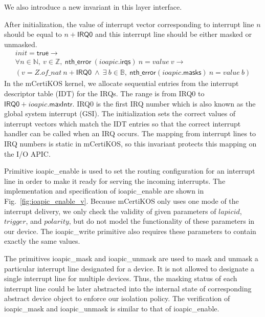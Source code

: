 We also introduce a new invariant in this layer interface.

\begin{invariant}
	After initialization, the value of interrupt vector corresponding to interrupt line $n$ should be equal to $n + \textsf{IRQ0}$ and this interrupt line should be either masked or unmasked.
	\[
	\begin{array}{l}
	init = \textsf{true} \rightarrow \\
	\forall n \in \mathbb{N}, ~ v \in \mathbb{Z},~
	\textsf{nth\_error}~ (ioapic.\textsf{irqs})~ n = value~ v \rightarrow \\
	( v = Z.of\_nat~ n + \textsf{IRQ0}  ~\wedge~ 
	\exists~ b \in \mathbb{B},~ \textsf{nth\_error} (ioapic.\textsf{masks})~ n = value~ b)
	\end{array}
	\]
	\noindent\textnormal{In the mCertiKOS kernel, we allocate sequential entries from
		the interrupt descriptor table (IDT) for the IRQs. The range is from
		\textsf{IRQ0} to $\textsf{IRQ0} + ioapic.\textsf{maxIntr}$. \textsf{IRQ0} is the
		first IRQ number which is also known as the global system interrupt (GSI). The
		initialization sets the correct values of interrupt vectors which match the IDT
		entries so that the correct interrupt handler can be called when an IRQ occurs.
		The mapping from interrupt lines to IRQ numbers is static in mCertiKOS, so this
		invariant protects this mapping on the I/O APIC. }
\end{invariant}

Primitive \textsf{ioapic\_enable} is used to set the routing configuration for
an interrupt line in order to make it ready for serving the incoming interrupts.
The implementation and specification of \textsf{ioapic\_enable} are shown in
Fig.~\ref{fig:ioapic_enable_v}. Because mCertiKOS only uses one mode of the
interrupt delivery, we only check the validity of given parameters of $lapicid$,
$trigger$, and $polarity$, but do not model the functionality of these
parameters in our device. The \textsf{ioapic\_write} primitive also requires
these parameters to contain exactly the same values.

The primitives \textsf{ioapic\_mask} and \textsf{ioapic\_unmask} are used to
mask and unmask a particular interrupt line designated for a device. It is not
allowed to designate a single interrupt line for multiple devices. Thus, the
masking status of each interrupt line could be later abstracted into the
internal state of corresponding abstract device object to enforce our isolation
policy. The verification of \textsf{ioapic\_mask} and \textsf{ioapic\_unmask}
is similar to that of \textsf{ioapic\_enable}.

